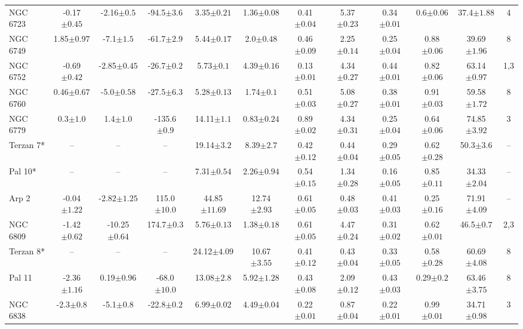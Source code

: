 \begin{landscape}
\begin{table}
\begin{tabular}{lccccccccccc}
NGC 6723 & -0.17$\pm{0.45}$ & -2.16$\pm{0.5}$ & -94.5$\pm{3.6}$ & 3.35$\pm{0.21}$ & 1.36$\pm{0.08}$ & 0.41$\pm{0.04}$ & 5.37$\pm{0.23}$ & 0.34$\pm{0.01}$ & 0.6$\pm{0.06}$ & 37.4$\pm{1.88}$&4 \\ 
NGC 6749 & 1.85$\pm{0.97}$ & -7.1$\pm{1.5}$ & -61.7$\pm{2.9}$ & 5.44$\pm{0.17}$ & 2.0$\pm{0.48}$ & 0.46$\pm{0.09}$ & 2.25$\pm{0.14}$ & 0.25$\pm{0.04}$ & 0.88$\pm{0.06}$ & 39.69$\pm{1.96}$&8 \\ 
NGC 6752 & -0.69$\pm{0.42}$ & -2.85$\pm{0.45}$ & -26.7$\pm{0.2}$ & 5.73$\pm{0.1}$ & 4.39$\pm{0.16}$ & 0.13$\pm{0.01}$ & 4.34$\pm{0.27}$ & 0.44$\pm{0.01}$ & 0.82$\pm{0.06}$ & 63.14$\pm{0.97}$&1,3 \\ 
NGC 6760 & 0.46$\pm{0.67}$ & -5.0$\pm{0.58}$ & -27.5$\pm{6.3}$ & 5.28$\pm{0.13}$ & 1.74$\pm{0.1}$ & 0.51$\pm{0.03}$ & 5.08$\pm{0.27}$ & 0.38$\pm{0.01}$ & 0.91$\pm{0.03}$ & 59.58$\pm{1.72}$&8 \\ 
NGC 6779 & 0.3$\pm{1.0}$ & 1.4$\pm{1.0}$ & -135.6$\pm{0.9}$ & 14.11$\pm{1.1}$ & 0.83$\pm{0.24}$ & 0.89$\pm{0.02}$ & 4.34$\pm{0.31}$ & 0.25$\pm{0.04}$ & 0.64$\pm{0.06}$ & 74.85$\pm{3.92}$&3 \\ 
Terzan 7* & -- & -- & -- & 19.14$\pm{3.2}$ & 8.39$\pm{2.7}$ & 0.42$\pm{0.12}$ & 0.44$\pm{0.04}$ & 0.29$\pm{0.05}$ & 0.62$\pm{0.28}$ & 50.3$\pm{3.6}$&-- \\ 
Pal 10* & -- & -- & -- & 7.31$\pm{0.54}$ & 2.26$\pm{0.94}$ & 0.54$\pm{0.15}$ & 1.34$\pm{0.28}$ & 0.16$\pm{0.05}$ & 0.85$\pm{0.11}$ & 34.33$\pm{2.04}$&-- \\ 
Arp 2 & -0.04$\pm{1.22}$ & -2.82$\pm{1.25}$ & 115.0$\pm{10.0}$ & 44.85$\pm{11.69}$ & 12.74$\pm{2.93}$ & 0.61$\pm{0.05}$ & 0.48$\pm{0.03}$ & 0.41$\pm{0.03}$ & 0.25$\pm{0.16}$ & 71.91$\pm{4.09}$&-- \\ 
NGC 6809 & -1.42$\pm{0.62}$ & -10.25$\pm{0.64}$ & 174.7$\pm{0.3}$ & 5.76$\pm{0.13}$ & 1.38$\pm{0.18}$ & 0.61$\pm{0.05}$ & 4.47$\pm{0.24}$ & 0.31$\pm{0.02}$ & 0.62$\pm{0.01}$ & 46.5$\pm{0.7}$&2,3 \\ 
Terzan 8* & -- & -- & -- & 24.12$\pm{4.09}$ & 10.67$\pm{3.55}$ & 0.41$\pm{0.12}$ & 0.43$\pm{0.04}$ & 0.33$\pm{0.05}$ & 0.58$\pm{0.28}$ & 60.69$\pm{4.08}$&8 \\ 
Pal 11 & -2.36$\pm{1.16}$ & 0.19$\pm{0.96}$ & -68.0$\pm{10.0}$ & 13.08$\pm{2.8}$ & 5.92$\pm{1.28}$ & 0.43$\pm{0.08}$ & 2.09$\pm{0.12}$ & 0.43$\pm{0.03}$ & 0.29$\pm{0.2}$ & 63.46$\pm{3.75}$&8 \\ 
NGC 6838 & -2.3$\pm{0.8}$ & -5.1$\pm{0.8}$ & -22.8$\pm{0.2}$ & 6.99$\pm{0.02}$ & 4.49$\pm{0.04}$ & 0.22$\pm{0.01}$ & 0.87$\pm{0.04}$ & 0.22$\pm{0.01}$ & 0.99$\pm{0.01}$ & 34.71$\pm{0.98}$&3 \\ 

\hline
\end{tabular}
\contcaption{}
\label{summary}
\end{table}
\end{landscape}


